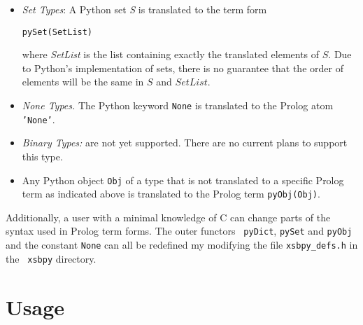 \begin{itemize}
         {\tt pyDict(DictList)}

         where {\tt DictList} is a list of tuples in term form: 

         {\tt ''(Key,Value)}

         {\tt Key} and {\tt Value} are the translations of any Python
         data structures that are both allowable as a dictionary key
         or value, and supported by {\tt xsbpy}.  For instance, {\tt
           Value} can be (the term form of) a list, a set, a tuple or
         another dictionary.

       \item {\em Set Types}: A Python set {\em S} is translated to
         the term form

         {\tt pySet(SetList)}

         where {\em SetList} is the list containing exactly the
         translated elements of $S$.  Due to Python's implementation
         of sets, there is no guarantee that the order of elements
         will be the same in $S$ and $SetList$.
       \item {\em None Types.} The Python keyword {\tt None} is
         translated to the Prolog atom {\tt 'None'}. 
       \item {\em Binary Types:} are not yet supported.  There are no
         current plans to support this type.
     \item Any Python object {\tt Obj} of a type that is not
       translated to a specific Prolog term as indicated above is
       translated to the Prolog term {\tt pyObj(Obj)}. 
\end{itemize}

Additionally, a user with a minimal knowledge of C can change parts of
the syntax used in Prolog term forms.  The outer functors {\tt
  pyDict}, {\tt pySet} and {\tt pyObj} and the constant {\tt None} can
all be redefined my modifying the file {\tt xsbpy\_defs.h} in the {\tt
  xsbpy} directory.

\section{Usage}

